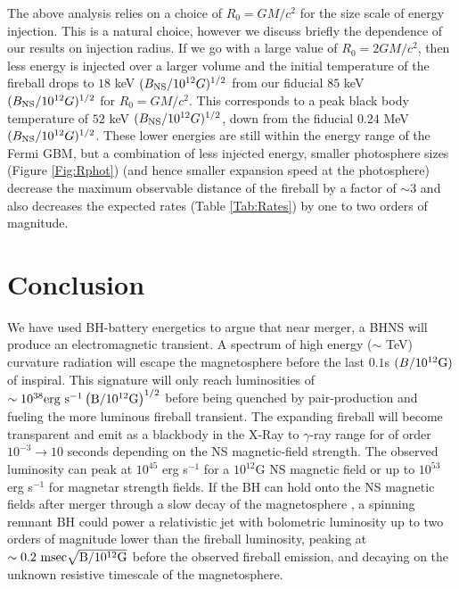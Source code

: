 The above analysis relies on a choice of $R_0=GM/c^2$ for the size
scale of energy injection. This is a natural choice, however we
discuss briefly the dependence of our results on
injection radius. If we go with a large value of $R_0=2GM/c^2$, then less energy is injected
over a larger volume and the initial temperature of the fireball drops
to $18$ keV $(B_{\rm NS}/10^{12} G )^{1/2}$ from our fiducial $85$ keV
$(B_{\rm NS}/10^{12} G )^{1/2}$ for $R_0=GM/c^2$. This corresponds to
a peak black body temperature of $52$ keV $(B_{\rm NS}/10^{12} G
)^{1/2}$, down from the fiducial $0.24$ MeV $(B_{\rm NS}/10^{12} G
)^{1/2}$. These lower energies are still within the energy range of
the Fermi GBM, but a combination of less injected energy, smaller
photosphere sizes (Figure \ref{Fig:Rphot}) (and hence smaller
expansion speed at the photosphere) decrease the maximum observable
distance of the fireball by a factor of $\sim3$ and also decreases the
expected rates (Table \ref{Tab:Rates}) by one to two orders of
magnitude.

\section{Conclusion}
We have used BH-battery energetics to argue that near merger, a BHNS
will produce an electromagnetic transient.  A spectrum of high energy
($\sim$ TeV) curvature radiation will escape the magnetosphere before
the last $0.1$s $(B/10^{12}\rm{G})$ of inspiral. This signature will
only reach luminosities of $\sim 10^{38} \rm{erg} \ \rm{s}^{-1}
\left(B/10^{12}\rm{G}\right)^{1/2}$ before being quenched by
pair-production and fueling the more luminous fireball transient.  The
expanding fireball will become transparent and emit as a blackbody in
the X-Ray to $\gamma$-ray range for of order $10^{-3} \rightarrow 10$
seconds depending on the NS magnetic-field strength. The observed
luminosity can peak at $10^{45}$ erg s$^{-1}$ for a $10^{12}$G NS
magnetic field or up to $10^{53}$ erg s$^{-1}$ for magnetar strength
fields. If the BH can hold onto the NS magnetic fields after merger
through a slow decay of the magnetosphere
\citep{LyutikovMckinney:2011}, a spinning remnant BH could power a
relativistic jet with bolometric luminosity up to two orders of
magnitude lower than the fireball luminosity, peaking at $ \sim 0.2
\ \rm{msec} \sqrt{B/10^{12}\rm{G}}$ before the observed fireball
emission, and decaying on the unknown resistive timescale of the
magnetosphere.




